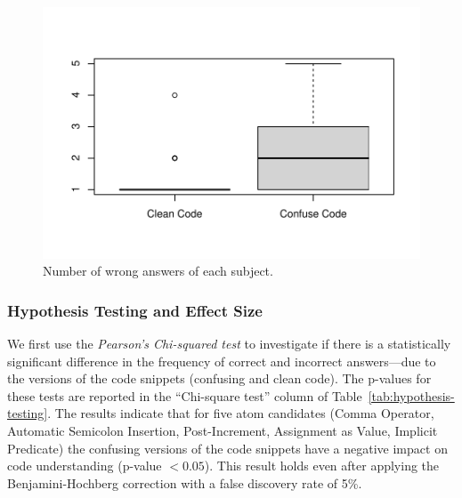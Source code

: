 \begin{figure}[b!]
\noindent
\vspace*{-1.4cm}
 \centering
 \includegraphics[width=\columnwidth]{images/wrong-answers-plot-1.pdf}
 \vspace*{-1.3cm}
 \caption{Number of wrong answers of each subject.}
 \label{fig:boxplotcorrectness}
 \end{figure}


\subsubsection*{Hypothesis Testing and Effect Size}

We first use the \emph{Pearson's Chi-squared test}
to investigate if there is a statistically significant difference in the frequency of correct and incorrect answers---due to the versions of the code snippets (confusing and clean code). The p-values for these tests are reported in the ``Chi-square test'' column of Table~\ref{tab:hypothesis-testing}. The results indicate that for five atom candidates (Comma Operator, Automatic Semicolon Insertion, Post-Increment, Assignment as Value, Implicit Predicate) the confusing versions of the code snippets have a negative impact on code understanding (p-value $< 0.05$). This result holds even after applying the Benjamini-Hochberg correction with a false discovery rate of 5\%. 

